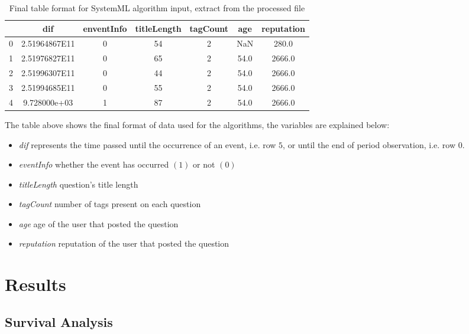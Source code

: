 \documentclass[11pt]{article} %
\begin{document}
    \begin{table}[!ht]
      \centering
      \begin{tabular}{|c|c|c|c|c|c|c|}
        \hline
           & dif & enventInfo & titleLength & tagCount & age & reputation \\ \hline
          0 & 2.51964867E11 & 0   & 54  & 2 & NaN & 280.0 \\ \hline
          1 & 2.51976827E11 & 0   & 65  & 2 & 54.0 & 2666.0 \\ \hline
          2 & 2.51996307E11 & 0   & 44  & 2 & 54.0 & 2666.0 \\ \hline
          3 & 2.51994685E11 & 0   & 55  & 2 & 54.0 & 2666.0 \\ \hline
          4 & 9.728000e+03  & 1   & 87	& 2	& 54.0 & 2666.0 \\ \hline
      \end{tabular}
      \caption{Final table format for SystemML algorithm input, extract from the processed file}
      \label{tab:final_table_format}
    \end{table}

    The table above shows the final format of data used for the algorithms, the variables are explained below:
    \begin{itemize}
      \item \emph{dif} represents the time passed until the occurrence of an event, i.e. row $5$, or until the end of period observation, i.e. row $0$.
      \item \emph{eventInfo} whether the event has occurred $(1)$ or not $(0)$
      \item \emph{titleLength} question's title length
      \item \emph{tagCount} number of tags present on each question
      \item \emph{age} age of the user that posted the question
      \item \emph{reputation} reputation of the user that posted the question
    \end{itemize}

\section{Results}
  \label{sec:results}

  \subsection{Survival Analysis}
\end{document}
